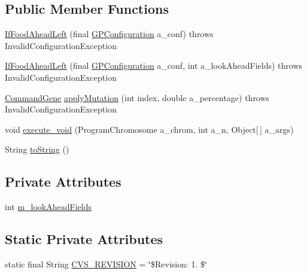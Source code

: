 \subsection*{Public Member Functions}
\begin{DoxyCompactItemize}
\item 
\hyperlink{classexamples_1_1gp_1_1anttrail_1_1_if_food_ahead_left_a27aa79a5ee225a35efcb322ce6d2ddf8}{If\-Food\-Ahead\-Left} (final \hyperlink{classorg_1_1jgap_1_1gp_1_1impl_1_1_g_p_configuration}{G\-P\-Configuration} a\-\_\-conf)  throws Invalid\-Configuration\-Exception 
\item 
\hyperlink{classexamples_1_1gp_1_1anttrail_1_1_if_food_ahead_left_ac7efb16b8c7c1d22dabcfb791b376f51}{If\-Food\-Ahead\-Left} (final \hyperlink{classorg_1_1jgap_1_1gp_1_1impl_1_1_g_p_configuration}{G\-P\-Configuration} a\-\_\-conf, int a\-\_\-look\-Ahead\-Fields)  throws Invalid\-Configuration\-Exception 
\item 
\hyperlink{classorg_1_1jgap_1_1gp_1_1_command_gene}{Command\-Gene} \hyperlink{classexamples_1_1gp_1_1anttrail_1_1_if_food_ahead_left_ae41650df1e3e9ab07e90396165521740}{apply\-Mutation} (int index, double a\-\_\-percentage)  throws Invalid\-Configuration\-Exception 
\item 
void \hyperlink{classexamples_1_1gp_1_1anttrail_1_1_if_food_ahead_left_ae247d0645083f29e89ab5f66a9d3691d}{execute\-\_\-void} (Program\-Chromosome a\-\_\-chrom, int a\-\_\-n, Object\mbox{[}$\,$\mbox{]} a\-\_\-args)
\item 
String \hyperlink{classexamples_1_1gp_1_1anttrail_1_1_if_food_ahead_left_af253b043bbc8c9881059dceb53afe151}{to\-String} ()
\end{DoxyCompactItemize}
\subsection*{Private Attributes}
\begin{DoxyCompactItemize}
\item 
int \hyperlink{classexamples_1_1gp_1_1anttrail_1_1_if_food_ahead_left_a07efe82b3075e75d1141e4f8971fd45a}{m\-\_\-look\-Ahead\-Fields}
\end{DoxyCompactItemize}
\subsection*{Static Private Attributes}
\begin{DoxyCompactItemize}
\item 
static final String \hyperlink{classexamples_1_1gp_1_1anttrail_1_1_if_food_ahead_left_ab9e17adfb699c1a64c12495a3eff6a7d}{C\-V\-S\-\_\-\-R\-E\-V\-I\-S\-I\-O\-N} = \char`\"{}\$Revision\-: 1. \$\char`\"{}
\end{DoxyCompactItemize}
